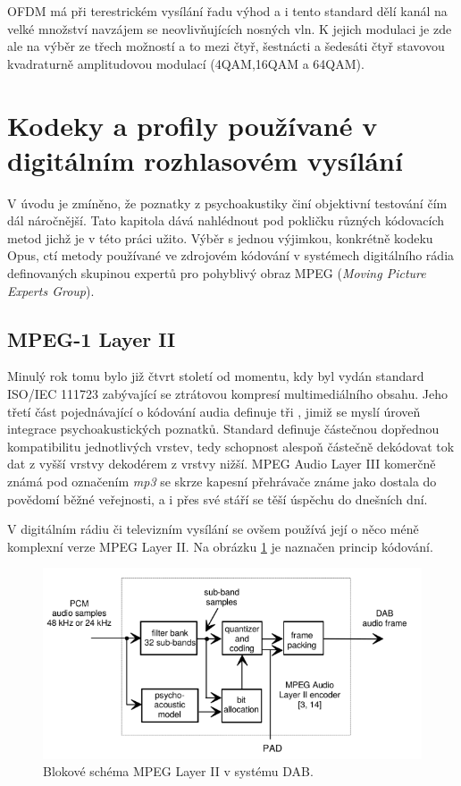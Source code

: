 OFDM má při terestrickém vysílání řadu výhod a i tento standard dělí kanál na velké množství navzájem se neovlivňujících nosných vln. K jejich modulaci je zde ale na výběr ze třech možností a to mezi čtyř, šestnácti a šedesáti čtyř stavovou kvadraturně amplitudovou modulací (4QAM,16QAM a 64QAM).

\section{Kodeky a profily používané v digitálním rozhlasovém vysílání}
\label{subchap:codecs}

V úvodu je zmíněno, že poznatky z psychoakustiky činí objektivní testování čím dál náročnější. Tato kapitola dává nahlédnout pod pokličku různých kódovacích metod jichž je v této práci užito. Výběr s jednou výjimkou, konkrétně kodeku Opus, ctí metody používané ve zdrojovém kódování v systémech digitálního rádia definovaných skupinou expertů pro pohyblivý obraz MPEG (\textit{Moving Picture Experts Group}).

\subsection{MPEG-1 Layer II}

Minulý rok tomu bylo již čtvrt století od momentu, kdy byl vydán standard ISO/IEC 111723 \cite{norm:mp2} zabývající se ztrátovou kompresí multimediálního obsahu. Jeho třetí část pojednávající o kódování audia definuje tři , jimiž se myslí úroveň integrace psychoakustických poznatků. Standard definuje částečnou dopřednou kompatibilitu jednotlivých vrstev, tedy schopnost alespoň částečně dekódovat tok dat z vyšší vrstvy dekodérem z vrstvy nižší. MPEG Audio Layer III komerčně známá pod označením \textit{mp3} se skrze kapesní přehrávače známe jako  dostala do povědomí běžné veřejnosti, a i přes své stáří se těší úspěchu do dnešních dní.

V digitálním rádiu či televizním vysílání se ovšem používá její o něco méně komplexní verze MPEG Layer II. Na obrázku \ref{pic:mp2} je naznačen princip kódování.

\begin{figure}[h]
    \centering
    \includegraphics[width=.7\textwidth]{pic/mpeg2.png}
    \caption{Blokové schéma MPEG Layer II v systému DAB. \cite{web:mp2} }
    \label{pic:mp2}
\end{figure}

